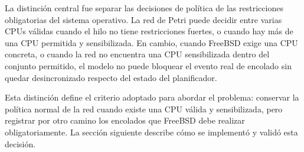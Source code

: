 La distinción central fue separar las decisiones de política de las restricciones obligatorias del sistema operativo. La red de Petri puede decidir entre varias CPUs válidas cuando el hilo no tiene restricciones fuertes, o cuando hay más de una CPU permitida y sensibilizada. En cambio, cuando FreeBSD exige una CPU concreta, o cuando la red no encuentra una CPU sensibilizada dentro del conjunto permitido, el modelo no puede bloquear el evento real de encolado sin quedar desincronizado respecto del estado del planificador.\par

Esta distinción define el criterio adoptado para abordar el problema: conservar la política normal de la red cuando existe una CPU válida y sensibilizada, pero registrar por otro camino los encolados que FreeBSD debe realizar obligatoriamente. La sección siguiente describe cómo se implementó y validó esta decisión.\par








